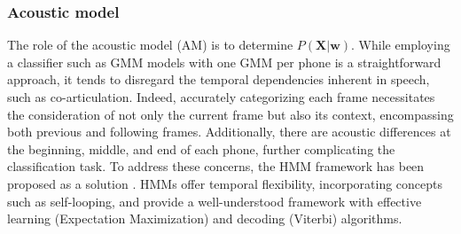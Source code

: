 \subsubsection{Acoustic model}%
The role of the acoustic model (AM) is to determine $P(\boldsymbol{X}|\boldsymbol{w})$. While employing a classifier such as GMM models with one GMM per phone is a straightforward approach, it tends to disregard the temporal dependencies inherent in speech, such as co-articulation. Indeed, accurately categorizing each frame necessitates the consideration of not only the current frame but also its context, encompassing both previous and following frames. Additionally, there are acoustic differences at the beginning, middle, and end of each phone, further complicating the classification task. To address these concerns, the HMM framework has been proposed as a solution \cite{Dragon_system}. HMMs offer temporal flexibility, incorporating concepts such as self-looping, and provide a well-understood framework with effective learning (Expectation Maximization) and decoding (Viterbi) algorithms. 

